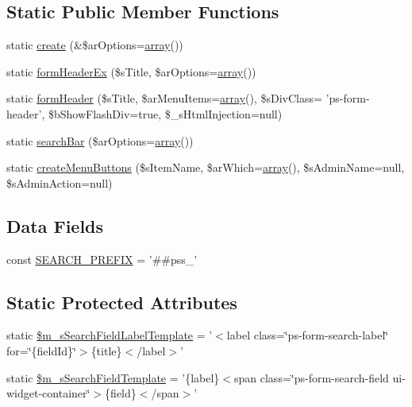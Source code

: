 \subsection*{Static Public Member Functions}
\begin{DoxyCompactItemize}
\item 
static \hyperlink{classCPSForm_ac13da1fcb700bedd58bfe9d517689e75}{create} (\&\$arOptions=\hyperlink{list_8php_aa3205d038c7f8feb5c9f01ac4dfadc88}{array}())
\item 
static \hyperlink{classCPSForm_a3ff5ebd31312034b030ce1273675dde2}{formHeaderEx} (\$sTitle, \$arOptions=\hyperlink{list_8php_aa3205d038c7f8feb5c9f01ac4dfadc88}{array}())
\item 
static \hyperlink{classCPSForm_abdc7cb1b60d042a0308ef8885a4ea842}{formHeader} (\$sTitle, \$arMenuItems=\hyperlink{list_8php_aa3205d038c7f8feb5c9f01ac4dfadc88}{array}(), \$sDivClass= 'ps-\/form-\/header', \$bShowFlashDiv=true, \$\_\-sHtmlInjection=null)
\item 
static \hyperlink{classCPSForm_a8e1373c33441797032b0d9865be4297f}{searchBar} (\$arOptions=\hyperlink{list_8php_aa3205d038c7f8feb5c9f01ac4dfadc88}{array}())
\item 
static \hyperlink{classCPSForm_ac2b4267a947155171acc31b8d70a798b}{createMenuButtons} (\$sItemName, \$arWhich=\hyperlink{list_8php_aa3205d038c7f8feb5c9f01ac4dfadc88}{array}(), \$sAdminName=null, \$sAdminAction=null)
\end{DoxyCompactItemize}
\subsection*{Data Fields}
\begin{DoxyCompactItemize}
\item 
const \hyperlink{classCPSForm_a5928a64b83ef2247c22303d1afb01781}{SEARCH\_\-PREFIX} = '\#\#pss\_\-'
\end{DoxyCompactItemize}
\subsection*{Static Protected Attributes}
\begin{DoxyCompactItemize}
\item 
static \hyperlink{classCPSForm_ab8c9743da4d2bf130427aa9e59fa9243}{\$m\_\-sSearchFieldLabelTemplate} = '$<$label class=\char`\"{}ps-\/form-\/search-\/label\char`\"{} for=\char`\"{}\{fieldId\}\char`\"{}$>$\{title\}$<$/label$>$'
\item 
static \hyperlink{classCPSForm_af73e8ea30d5e912f9a7d9cd6e950dd54}{\$m\_\-sSearchFieldTemplate} = '\{label\}$<$span class=\char`\"{}ps-\/form-\/search-\/field ui-\/widget-\/container\char`\"{}$>$\{field\}$<$/span$>$'
\end{DoxyCompactItemize}


